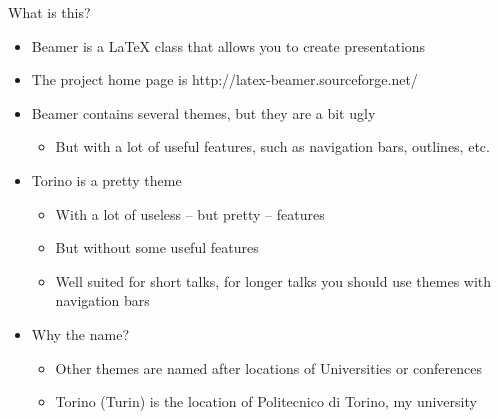 \begin{frame}[t]{What is this?}
\begin{itemize}
\item Beamer is a \LaTeX{} class that allows you to create presentations
\item The project home page is http://latex-beamer.sourceforge.net/
\item Beamer contains several themes, but they are a bit ugly
  \begin{itemize}
  \item But with a lot of useful features, such as navigation bars, outlines,
        etc.
  \end{itemize}
\item Torino is a pretty theme
  \begin{itemize}
  \item With a lot of useless -- but pretty -- features
  \item But without some useful features
  \item Well suited for short talks, for longer talks you should use themes
        with navigation bars
  \end{itemize}
\item Why the name?
  \begin{itemize}
  \item Other themes are named after locations of Universities or conferences
  \item Torino (Turin) is the location of Politecnico di Torino, my university
  \end{itemize}
\end{itemize}
\end{frame}

